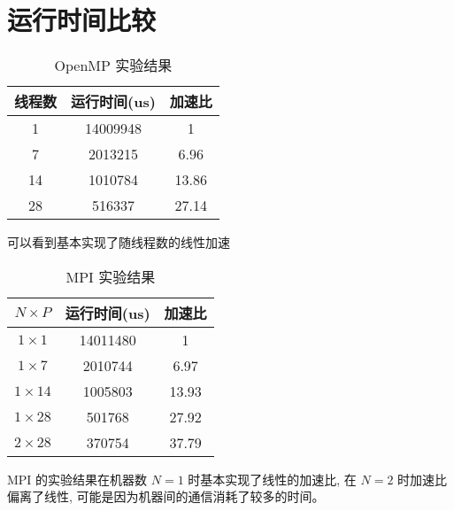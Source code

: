 \documentclass[a4paper, 12pt]{article}
\begin{document}
\section{运行时间比较}
\begin{table}[h]
    \centering
    \begin{tabular}{|c|c|c|}
        \hline
        线程数 & 运行时间(us) & 加速比  \\
        \hline
        1 & 14009948 & 1    \\
        7 & 2013215 & 6.96  \\
        14 & 1010784 & 13.86    \\
        28 & 516337 & 27.14 \\
        \hline
    \end{tabular}
    \caption{OpenMP 实验结果}
\end{table}
可以看到基本实现了随线程数的线性加速

\begin{table}[h]
    \centering
    \begin{tabular}{|c|c|c|}
    \hline
    $N \times P$ & 运行时间(us) & 加速比  \\
    \hline
    $1 \times 1$ & 14011480 & 1    \\
    $1 \times 7$ & 2010744 & 6.97  \\
    $1 \times 14$ & 1005803 & 13.93    \\
    $1 \times 28$ & 501768 & 27.92 \\
    $2 \times 28$ & 370754 & 37.79  \\
    \hline
    \end{tabular}
    \caption{MPI 实验结果}
\end{table}
MPI 的实验结果在机器数 $N = 1$ 时基本实现了线性的加速比,
在 $N = 2$ 时加速比偏离了线性, 可能是因为机器间的通信消耗了较多的时间。
\end{document}
